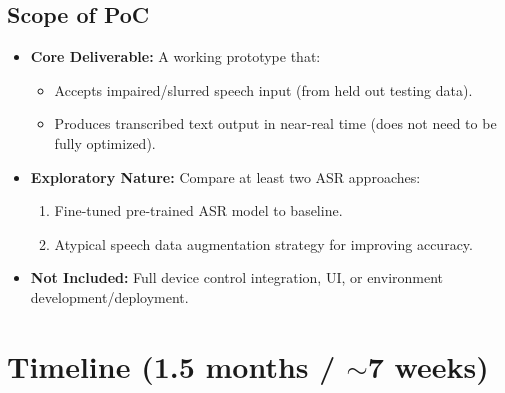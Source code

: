 \documentclass{article}
\begin{document}
\subsection{Scope of PoC}

\begin{itemize}
    \item \textbf{Core Deliverable:} A working prototype that:
    \begin{itemize}
        \item Accepts impaired/slurred speech input (from held out testing data).
        \item Produces transcribed text output in near-real time (does not need to be fully optimized).
    \end{itemize}
    
    \item \textbf{Exploratory Nature:} Compare at least two ASR approaches:
    \begin{enumerate}
        \item Fine-tuned pre-trained ASR model to baseline.
        \item Atypical speech data augmentation strategy for improving accuracy.
    \end{enumerate}
    
    \item \textbf{Not Included:} Full device control integration, UI, or environment development/deployment.
\end{itemize}

\section{Timeline (1.5 months / $\sim$7 weeks)}
\end{document}
